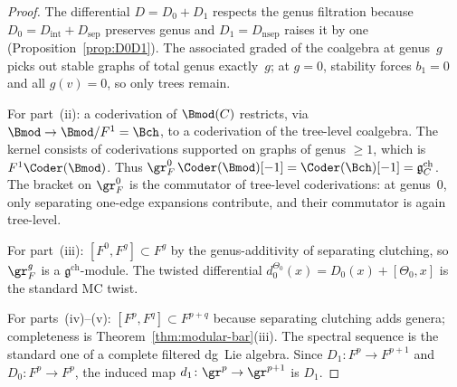 \begin{proof}
The differential $D = D_0 + D_1$ respects the genus filtration
because $D_0 = D_{\mathrm{int}} + D_{\mathrm{sep}}$ preserves
genus and $D_1 = D_{\mathrm{nsep}}$ raises it by one
(Proposition~\ref{prop:D0D1}). The associated graded of the
coalgebra at genus~$g$ picks out stable graphs of total genus
exactly~$g$; at $g = 0$, stability forces $b_1 = 0$ and all
$g(v) = 0$, so only trees remain.

For part~(ii): a coderivation of $\Bmod(C)$ restricts, via
$\Bmod \to \Bmod/F^1 = \Bch$, to a coderivation of the tree-level
coalgebra. The kernel consists of coderivations supported on
graphs of genus $\ge 1$, which is $F^1\Coder(\Bmod)$. Thus
$\gr_F^0\,\Coder(\Bmod)[-1] = \Coder(\Bch)[-1] =
\mathfrak{g}^{\mathrm{ch}}_C$. The bracket on $\gr^0_F$ is the
commutator of tree-level coderivations: at genus~$0$, only
separating one-edge expansions contribute, and their commutator
is again tree-level.

For part~(iii): $[F^0, F^g] \subset F^g$ by the genus-additivity
of separating clutching, so $\gr_F^g$ is a
$\mathfrak{g}^{\mathrm{ch}}$-module. The twisted differential
$d_0^{\Theta_0}(x) = D_0(x) + [\Theta_0, x]$ is the standard
MC twist.

For parts~(iv)--(v): $[F^p, F^q] \subset F^{p+q}$ because
separating clutching adds genera; completeness is
Theorem~\ref{thm:modular-bar}(iii). The spectral sequence is
the standard one of a complete filtered dg~Lie algebra. Since
$D_1 \colon F^p \to F^{p+1}$ and $D_0 \colon F^p \to F^p$, the
induced map $d_1 \colon \gr^p \to \gr^{p+1}$ is $D_1$.
\end{proof}

